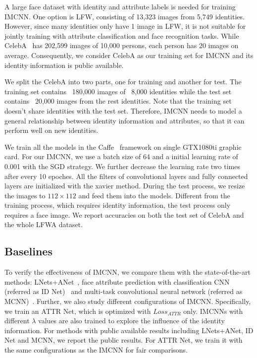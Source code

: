 \documentclass[wcp]{jmlr}
\begin{document}
	A large face dataset with identity and attribute labels is needed for training IMCNN. One option is LFW, consisting of 13,323 images from 5,749 identities. However, since many identities only have 1 image in LFW, it is not suitable for jointly training with attribute classification and face recognition tasks. While CelebA~\cite{CelebA} has 202,599 images of 10,000 persons, each person has 20 images on average. Consequently, we consider CelebA as our training set for IMCNN and its identity information is public available.
	
	We split the CelebA into two parts, one for training and another for test. The training set contains ~180,000 images of ~8,000 identities while the test set contains ~20,000 images from the rest identities. Note that the training set doesn't share identities with the test set. Therefore, IMCNN needs to model a general relationship between identity information and attributes, so that it can perform well on new identities.
	
	We train all the models in the Caffe~\cite{Caffe} framework on single GTX1080ti graphic card. For our IMCNN, we use a batch size of 64 and a initial learning rate of 0.001 with the SGD strategy. We further decrease the learning rate two times after every 10 epoches. All the filters of convolutional layers and fully connected layers are initialized with the xavier method. During the test process, we resize the images to $112 \times 112$ and feed them into the models. Different from the training process, which requires identity information, the test process only requires a face image. We report accuracies on both the test set of CelebA and the whole LFWA dataset.
	
	\subsection{Baselines}
	
	To verify the effectiveness of IMCNN, we compare them with the state-of-the-art methods: LNets+ANet~\cite{CelebA}, face attribute prediction with classification CNN (referred as ID Net)~\cite{ClassificationCNN} and multi-task convolutional neural network (referred as MCNN)~\cite{MCNN}. Further, we also study different configurations of IMCNN. Specifically, we train an ATTR Net, which is optimized with $Loss_{ATTR}$ only. IMCNNs with different $\lambda$ values are also trained to explore the influence of the identity information. For methods with public available results including LNets+ANet, ID Net and MCNN, we report the public results. For ATTR Net, we train it with the same configurations as the IMCNN for fair comparisons.
	
\end{document}
